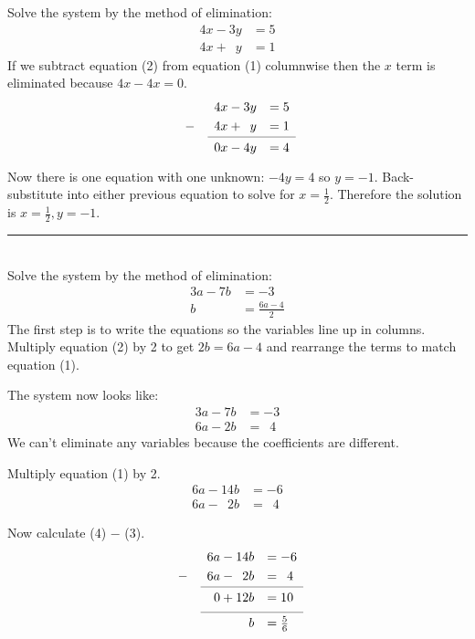 \example Solve the system by the method of elimination:
\begin{align*}
4x-3y&=5\tag{1}\\
4x+\phantom{1}y&=1\tag{2}
\end{align*}
\solution If we subtract equation (2) from equation (1) columnwise then the $x$ term is eliminated because $4x-4x=0$.
\[\begin{array}{lrl}
  			 &4x-3y	         &=5 \\[\jot]
 -\phantom{1}&4x+\phantom{1}y&=1 \\
\cmidrule{2-3}
 & 0x-4y &=4  \\[\jot]
\end{array}\]
Now there is one equation with one unknown: $-4y=4$ so $y=-1$. Back-substitute into either previous equation to solve for $x=\frac{1}{2}$. Therefore the solution is $x=\frac{1}{2},y=-1$.\\
\rule{6.8cm}{0.5pt}\\
\example Solve the system by the method of elimination:
\begin{align*}
3a-7b&=-3\tag{1}\\
b&=\frac{6a-4}{2}\tag{2}
\end{align*}
\solution The first step is to write the equations so the variables line up in columns. Multiply equation (2) by 2 to get $2b=6a-4$ and rearrange the terms to match equation (1).

\begin{minipage}[t]{0.3\linewidth}
The system now looks like:
\begin{align*}
3a-7b&=-3\tag{1}\\
6a-2b&=\phantom{1}4\tag{3}
\end{align*}
We can't eliminate any variables because the coefficients are different.
\end{minipage}
\hspace{\fill}
\begin{minipage}[t]{0.3\linewidth}
Multiply equation (1) by 2.
\begin{align*}
6a-14b&=-6\tag{4}\\
6a-\phantom{1}2b&=\phantom{1}4\tag{3}
\end{align*}
\end{minipage}
\hspace{\fill}
\begin{minipage}[t]{0.3\linewidth}
Now calculate (4) $-$ (3).
\[\begin{array}{lrl}
			&	       6a-14b&=-6			\\[\jot]
-\phantom{1}&6a-\phantom{1}2b&=\phantom{1}4 \\
\cmidrule{2-3}
& 0+12b&=10  \\[\jot]
\cmidrule{2-3}
& b&=\frac{5}{6}  \\[\jot]
\end{array}\]
\end{minipage}

